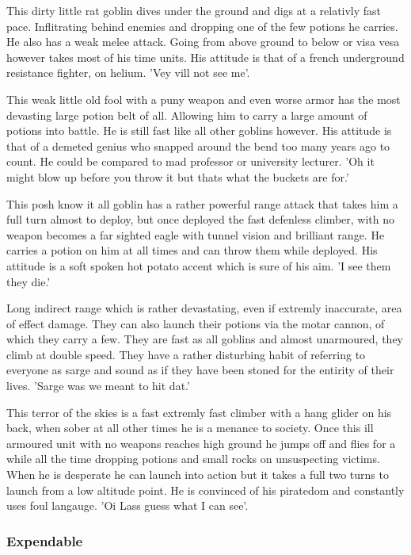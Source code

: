 \documentclass[a4paper]{article}
\begin{document}
This dirty little rat goblin dives under the ground and digs at a relativly fast pace. Inflitrating behind enemies and dropping one of the few potions he carries. He also has a weak melee attack. Going from above ground to below or visa vesa however takes most of his time units. His attitude is that of a french underground resistance fighter, on helium. 'Vey vill not see me'.

This weak little old fool with a puny weapon and even worse armor has the most devasting large potion belt of all. Allowing him to carry a large amount of potions into battle. He is still fast like all other goblins however. His attitude is that of a demeted genius who snapped around the bend too many years ago to count. He could be compared to mad professor or university lecturer. 'Oh it might blow up before you throw it but thats what the buckets are for.'

This posh know it all goblin has a rather powerful range attack that takes him a full turn almost to deploy, but once deployed the fast defenless climber, with no weapon becomes a far sighted eagle with tunnel vision and brilliant range. He carries a potion on him at all times and can throw them while deployed. His attitude is a soft spoken hot potato accent which is sure of his aim. 'I see them they die.'

Long indirect range which is rather devastating, even if extremly inaccurate, area of effect damage. They can also launch their potions via the motar cannon, of which they carry a few. They are fast as all goblins and almost unarmoured, they climb at double speed. They have a rather disturbing habit of referring to everyone as sarge and sound as if they have been stoned for the entirity of their lives. 'Sarge was we meant to hit dat.'

This terror of the skies is a fast extremly fast climber with a hang glider on his back, when sober at all other times he is a menance to society. Once this ill armoured unit with no weapons reaches high ground he jumps off and flies for a while all the time dropping potions and small rocks on unsuspecting victims. When he is desperate he can launch into action but it takes a full two turns to launch from a low altitude point. He is convinced of his piratedom and constantly uses foul langauge. 'Oi Lass guess what I can see'.

\subsubsection{Expendable}
\end{document}
